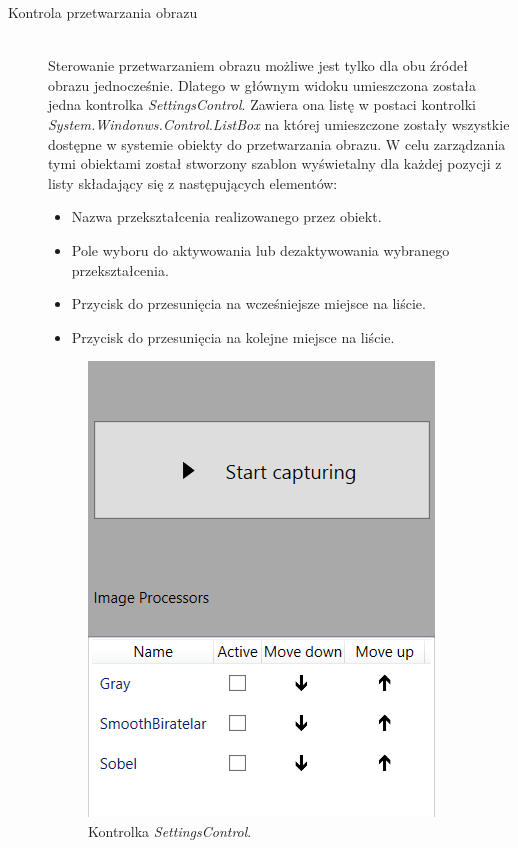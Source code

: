 \documentclass[a4paper,11pt,twoside]{report}
\theoremstyle{definition}
\begin{document}
\begin{description}
\item [Kontrola przetwarzania obrazu] \hfill \\
Sterowanie przetwarzaniem obrazu możliwe jest tylko dla obu źródeł obrazu jednocześnie. Dlatego w głównym widoku umieszczona została jedna kontrolka \textit{SettingsControl}. Zawiera ona listę w postaci kontrolki \textit{System.Windonws.Control.ListBox} na której umieszczone zostały wszystkie dostępne w systemie obiekty do przetwarzania obrazu. W celu zarządzania tymi obiektami został stworzony szablon wyświetalny dla każdej pozycji z listy składający się z następujących elementów:

\begin{itemize}
\item Nazwa przekształcenia realizowanego przez obiekt.
\item Pole wyboru do aktywowania lub dezaktywowania wybranego przekształcenia.
\item Przycisk do przesunięcia na wcześniejsze miejsce na liście.
\item Przycisk do przesunięcia na kolejne miejsce na liście.
\end{itemize}

\begin{figure}[h]
\centering
\includegraphics[scale=0.5]{images/settingscontrol_screen}
\caption[Widok aplikacji]{Kontrolka \textit{SettingsControl}.}
\end{figure}


\end{description}
\end{document}
